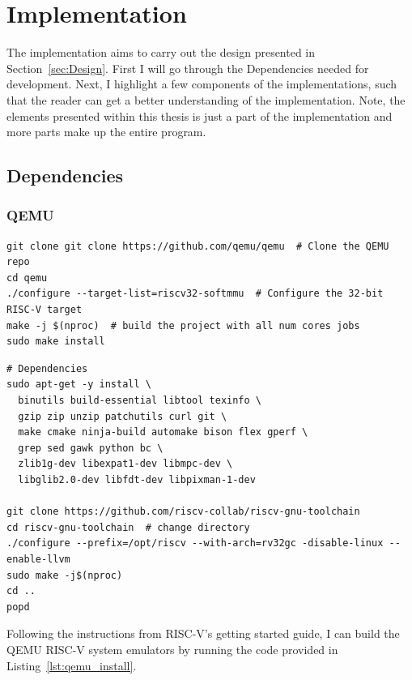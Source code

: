 \section{Implementation}
The implementation aims to carry out the design presented in
Section~\ref{sec:Design}. First I will go through the Dependencies needed for
development. Next, I highlight a few components of the implementations, such
that the reader can get a better understanding of the implementation. Note, the
elements presented within this thesis is just a part of the implementation and
more parts make up the entire program.

\subsection{Dependencies}
\subsubsection*{QEMU}
\begin{lstlisting}[caption=Installing QEMU, label=lst:qemu_install, float]
git clone git clone https://github.com/qemu/qemu  # Clone the QEMU repo
cd qemu
./configure --target-list=riscv32-softmmu  # Configure the 32-bit RISC-V target
make -j $(nproc)  # build the project with all num cores jobs
sudo make install
\end{lstlisting}
\begin{lstlisting}[caption=Installing LLVM compiler infastructure with RISC-V
32-bit as native target., label=lst:llvm_install, float]
# Dependencies
sudo apt-get -y install \
  binutils build-essential libtool texinfo \
  gzip zip unzip patchutils curl git \
  make cmake ninja-build automake bison flex gperf \
  grep sed gawk python bc \
  zlib1g-dev libexpat1-dev libmpc-dev \
  libglib2.0-dev libfdt-dev libpixman-1-dev

git clone https://github.com/riscv-collab/riscv-gnu-toolchain
cd riscv-gnu-toolchain  # change directory
./configure --prefix=/opt/riscv --with-arch=rv32gc -disable-linux --enable-llvm
sudo make -j$(nproc)
cd ..
popd
\end{lstlisting}
Following the instructions from RISC-V's getting started guide, I can build the
QEMU RISC-V system emulators by running the code provided in
Listing~\ref{lst:qemu_install}\cite{RISC-V_GS}.


